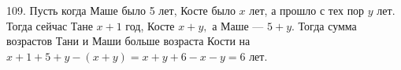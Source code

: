 109. Пусть когда Маше было 5 лет, Косте было $x$ лет, а прошло с тех пор $y$ лет. Тогда сейчас Тане $x+1$ год, Косте $x+y,$ а Маше --- $5+y.$ Тогда сумма возрастов Тани и Маши больше возраста Кости на $x+1+5+y-(x+y)=x+y+6-x-y=6$ лет.\\

